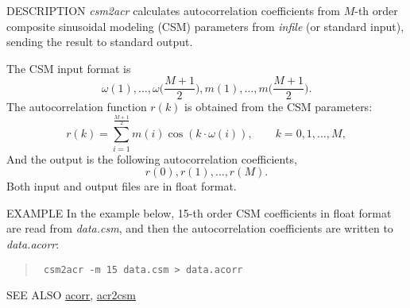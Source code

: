 \begin{synopsis}
\item [csm2acr] [ --m $M$ ] [ {\em infile} ] 
\end{synopsis}

\begin{qsection}{DESCRIPTION}
{\em csm2acr} calculates autocorrelation coefficients
from $M$-th order composite sinusoidal modeling (CSM) parameters 
from {\em infile} (or standard input),
sending the result to standard output.

The CSM input format is
\begin{displaymath}
   \omega(1), \dots , \omega\biggl(\frac{M+1}{2}\biggr), m(1), \dots , m\biggl(\frac{M+1}{2}\biggr).
\end{displaymath}
The autocorrelation function $r(k)$ is obtained from the CSM parameters:
\begin{displaymath}
   r(k)=\sum_{i=1}^{\frac{M+1}{2}}m(i)\cos(k\cdot\omega(i)), \qquad k=0,1,\dots,M,
\end{displaymath}
And the output is the following autocorrelation coefficients,
\begin{displaymath}
   r(0) , r(1), \dots , r(M).
\end{displaymath}
Both input and output files are in float format.

\end{qsection}

\begin{options}
\end{options}

\begin{qsection}{EXAMPLE}
In the example below, 15-th order CSM coefficients in float format
are read from {\em data.csm}, and then the autocorrelation coefficients are written to {\em data.acorr}:
\begin{quote}
\verb! csm2acr -m 15 data.csm > data.acorr!
\end{quote}
\end{qsection}

\begin{qsection}{SEE ALSO}
\hyperlink{acorr}{acorr},
\hyperlink{acr2csm}{acr2csm}
\end{qsection}
